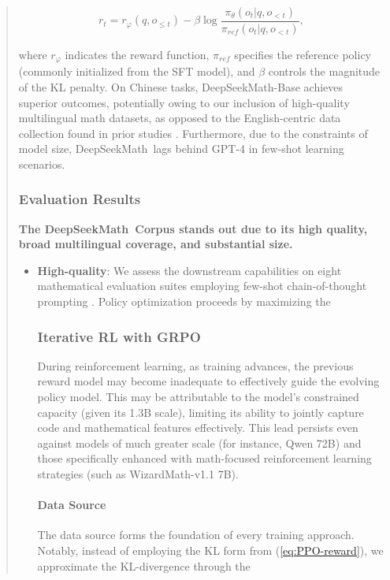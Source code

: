 \begin{abstract}
\begin{itemize}[topsep=0pt]
\begin{itemize}[topsep=0pt]
\begin{equation}
    r_{t} = r_\varphi(q, o_{\le t}) - \beta \log\frac{\pi_{\theta}(o_{t}|q, o_{<t})}{\pi_{ref}(o_{t}|q, o_{<t})},
\label{eq:PPO-reward}
\end{equation}

where $r_\varphi$ indicates the reward function, $\pi_{ref}$ specifies the reference policy (commonly initialized from the SFT model), and $\beta$ controls the magnitude of the KL penalty. On Chinese tasks, DeepSeekMath-Base achieves superior outcomes, potentially owing to our inclusion of high-quality multilingual math datasets, as opposed to the English-centric data collection found in prior studies \citep{minerva,llemma}. Furthermore, due to the constraints of model size, DeepSeekMath~lags behind GPT-4 in few-shot learning scenarios. \subsubsection{Evaluation Results}

\textbf{The DeepSeekMath~Corpus stands out due to its high quality, broad multilingual coverage, and substantial size.}

\begin{itemize}[topsep=0pt]
    \item \textbf{High-quality}:
    We assess the downstream capabilities on eight mathematical evaluation suites employing few-shot chain-of-thought prompting \cite{cot}. Policy optimization proceeds by maximizing the

\subsubsection{Iterative RL with GRPO} During reinforcement learning, as training advances, the previous reward model may become inadequate to effectively guide the evolving policy model. This may be attributable to the model’s constrained capacity (given its 1.3B scale), limiting its ability to jointly capture code and mathematical features effectively. This lead persists even against models of much greater scale (for instance, Qwen 72B) and those specifically enhanced with math-focused reinforcement learning strategies (such as WizardMath-v1.1 7B). \paragraph{Data Source} The data source forms the foundation of every training approach. Notably, instead of employing the KL form from (\ref{eq:PPO-reward}), we approximate the KL-divergence through the


\end{itemize}
\end{itemize}
\end{itemize}
\end{abstract}
